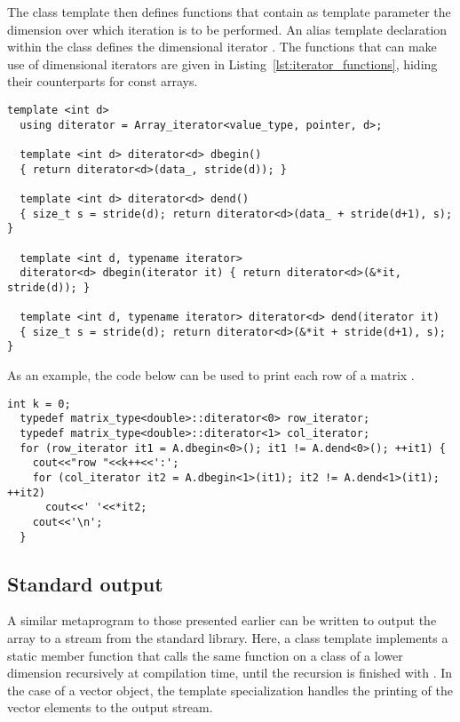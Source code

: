 \documentclass[11pt]{article}
\newcommand{\code}[1]{{\footnotesize\ttfamily{#1}}}
\begin{document}
The \code{Array} class template then defines functions that contain as template parameter the dimension over which iteration is to be performed.
An alias template declaration within the class defines the dimensional iterator \code{diterator}. The functions that can make use of dimensional iterators are given in Listing~\ref{lst:iterator_functions}, hiding their counterparts for const arrays.
\begin{lstlisting}[caption={Functions for dimensional iteration}, label=lst:iterator_functions]
  template <int d>
  using diterator = Array_iterator<value_type, pointer, d>;
  
  template <int d> diterator<d> dbegin()
  { return diterator<d>(data_, stride(d)); }
  
  template <int d> diterator<d> dend()
  { size_t s = stride(d); return diterator<d>(data_ + stride(d+1), s); }
  
  template <int d, typename iterator>
  diterator<d> dbegin(iterator it) { return diterator<d>(&*it, stride(d)); }
  
  template <int d, typename iterator> diterator<d> dend(iterator it)
  { size_t s = stride(d); return diterator<d>(&*it + stride(d+1), s); }
\end{lstlisting}
As an example, the code below can be used to print each row of a matrix \code{A}.
\begin{lstlisting}[frame=none]
  int k = 0;
  typedef matrix_type<double>::diterator<0> row_iterator;
  typedef matrix_type<double>::diterator<1> col_iterator;
  for (row_iterator it1 = A.dbegin<0>(); it1 != A.dend<0>(); ++it1) {
    cout<<"row "<<k++<<':';
    for (col_iterator it2 = A.dbegin<1>(it1); it2 != A.dend<1>(it1); ++it2)
      cout<<' '<<*it2;
    cout<<'\n';
  }
\end{lstlisting}


\subsection{Standard output}

A similar metaprogram to those presented earlier can be written to output the array to a stream from the standard library.
Here, a class template \code{Print} implements a \code{print} static member function that calls the same function on a class of a lower dimension recursively at compilation time, until the recursion is finished with \code{Print<2>}. In the case of a vector object, the template specialization \code{Print<1>} handles the printing of the vector elements to the output stream.
\end{document}
